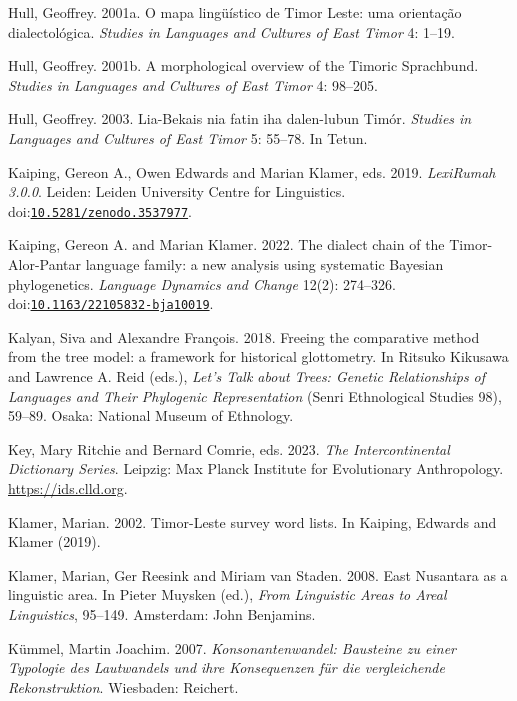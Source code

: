 \documentclass[11pt]{article}
\newcommand{\doi}[1]{doi:\href{https://doi.org/#1}{\nolinkurl{#1}}}
\begin{document}
\begin{thebibliography}{}
Hull, Geoffrey. 2001a. O mapa lingüístico de Timor Leste: uma orientação dialectológica. \emph{Studies in Languages and Cultures of East Timor} 4: 1--19.

Hull, Geoffrey. 2001b. A morphological overview of the Timoric Sprachbund. \emph{Studies in Languages and Cultures of East Timor} 4: 98--205.

Hull, Geoffrey. 2003. Lia-Bekais nia fatin iha dalen-lubun Timór. \emph{Studies in Languages and Cultures of East Timor} 5: 55--78. In Tetun.

Kaiping, Gereon A., Owen Edwards and Marian Klamer, eds. 2019. \emph{LexiRumah 3.0.0}. Leiden: Leiden University Centre for Linguistics. \doi{10.5281/zenodo.3537977}.

Kaiping, Gereon A. and Marian Klamer. 2022. The dialect chain of the Timor-Alor-Pantar language family: a new analysis using systematic Bayesian phylogenetics. \emph{Language Dynamics and Change} 12(2): 274--326. \doi{10.1163/22105832-bja10019}.

Kalyan, Siva and Alexandre François. 2018. Freeing the comparative method from the tree model: a framework for historical glottometry. In Ritsuko Kikusawa and Lawrence A. Reid (eds.), \emph{Let's Talk about Trees: Genetic Relationships of Languages and Their Phylogenic Representation} (Senri Ethnological Studies 98), 59--89. Osaka: National Museum of Ethnology.

Key, Mary Ritchie and Bernard Comrie, eds. 2023. \emph{The Intercontinental Dictionary Series}. Leipzig: Max Planck Institute for Evolutionary Anthropology. \url{https://ids.clld.org}.

Klamer, Marian. 2002. Timor-Leste survey word lists. In Kaiping, Edwards and Klamer (2019).

Klamer, Marian, Ger Reesink and Miriam van Staden. 2008. East Nusantara as a linguistic area. In Pieter Muysken (ed.), \emph{From Linguistic Areas to Areal Linguistics}, 95--149. Amsterdam: John Benjamins.

Kümmel, Martin Joachim. 2007. \emph{Konsonantenwandel: Bausteine zu einer Typologie des Lautwandels und ihre Konsequenzen für die vergleichende Rekonstruktion}. Wiesbaden: Reichert.


\end{thebibliography}
\end{document}
